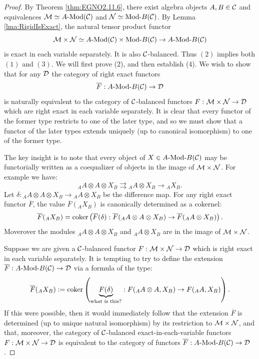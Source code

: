 \documentclass{amsart}
\begin{document}
\begin{proof}
	 By Theorem \ref{thm:EGNO2.11.6}, there exist algebra objects $A, B \in \mathcal C$ and equivalences $\cM \simeq \Mod{A}{}(\cC)$ and $\cN \simeq \Mod{}{B}(\cC)$. By Lemma \ref{lma:RigidIsExact}, the natural tensor product functor
	\begin{equation*}
		\cM \times \cN \simeq \Mod{A}{}(\cC) \times  \Mod{}{B}(\cC) \to \Mod{A}{B}(\cC)
	\end{equation*}
	is exact in each variable separately. It is also $\mathcal C$-balanced. Thus $(2)$ implies both  $(1)$ and $(3)$. We will first prove (2), and then establish (4).  We wish to show that for any $\mathcal D$ the category of right exact functors 
\begin{equation*}
	\overline{F}:\Mod{A}{B}(\cC) \to \cD
\end{equation*}
	is naturally equivalent to the category of $\mathcal C$-balanced functors $F:\mathcal M \times \mathcal N \to \mathcal D$ which are right exact in each variable separately. It is clear that every functor of the former type restricts to one of the later type, and so we must show that a functor of the later types extends uniquely (up to canonical isomorphism) to one of the former type. 
	
The key insight is to note that every object of $X \in \Mod{A}{B}(\cC)$ may be functorially written as a coequalizer of objects in the image of $\mathcal M \times \mathcal N$. For example we have:
\begin{equation*}
	{}_A A \otimes A \otimes X_B \rightrightarrows {}_A A \otimes X_B \to {}_A X_B.
\end{equation*}
Let $\delta: {}_A A \otimes A \otimes X_B \to {}_A A \otimes X_B$ be the difference map. 
For any right exact functor $\overline{F}$, the value $\overline{F}({}_A X_B)$ is canonically determined as a cokernel:
\begin{equation*}
	\overline{F}({}_A X_B) = \operatorname*{coker} \left( \overline{F}(\delta): \overline{F}({}_A A \otimes A \otimes X_B) \to \overline{F}({}_A A \otimes X_B) \right).
\end{equation*} 
Moverover the modules ${}_A A \otimes A \otimes X_B$ and ${}_A A \otimes X_B$ are in the image of $\mathcal M \times \mathcal N$. 
	
Suppose we are given a $\mathcal C$-balanced functor $F:\mathcal M \times \mathcal N \to \mathcal D$ which is right exact in each variable separately. It is tempting to try to define the extension $\overline{F}: \Mod{A}{B}(\cC) \to \cD$ via a formula of the type:
\begin{equation*}
	\overline{F}({}_A X_B) := \operatorname*{coker} \left( \underbrace{{F}(\delta)}_{\textrm{what is this?}}: F({}_A A \otimes A,  X_B) \to {F}({}_A A , X_B) \right).
\end{equation*} 
If this were possible, then it would immediately follow that the extension $\overline{F}$ is determined (up to unique natural isomorphism) by its restriction to $\mathcal M \times \mathcal N$, and that, moreover, the category of $\mathcal C$-balanced exact-in-each-variable functors $F:\mathcal M \times \mathcal N \to \mathcal D$ is equivalent to the category of functors  
$\overline{F}: \Mod{A}{B}(\cC) \to \cD$.


\end{proof}
\end{document}
